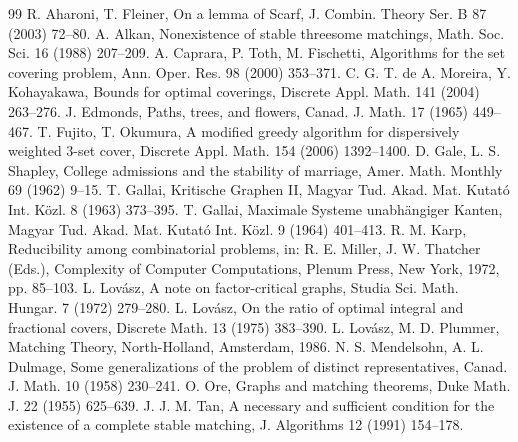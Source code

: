 \documentclass{article}
\theoremstyle{definition}
\begin{document}
\begin{thebibliography}{99}
\small
{} R. Aharoni, T. Fleiner, On a lemma of Scarf, J. Combin. Theory Ser. B 87 (2003) 72--80.
 A. Alkan, Nonexistence of stable threesome matchings, Math. Soc. Sci. 16 (1988) 207--209.
 A. Caprara, P. Toth, M. Fischetti, Algorithms for the set covering problem, Ann. Oper. Res. 98 (2000) 353--371.
 C. G. T. de A. Moreira, Y. Kohayakawa, Bounds for optimal coverings, Discrete Appl. Math. 141 (2004) 263--276.
 J. Edmonds, Paths, trees, and flowers, Canad. J. Math. 17 (1965) 449--467.
 T. Fujito, T. Okumura, A modified greedy algorithm for dispersively weighted $3$-set cover, Discrete Appl. Math. 154 (2006) 1392--1400.
 D. Gale, L. S. Shapley, College admissions and the stability of marriage, Amer. Math. Monthly 69 (1962) 9--15.
 T. Gallai, Kritische Graphen II, Magyar Tud. Akad. Mat. Kutat\'o Int. K\"ozl. 8 (1963) 373--395.
 T. Gallai, Maximale Systeme unabh\"angiger Kanten, Magyar Tud. Akad. Mat. Kutat\'o Int. K\"ozl. 9 (1964) 401--413.
 R. M. Karp, Reducibility among combinatorial problems, in: R. E. Miller, J. W. Thatcher (Eds.), Complexity of Computer Computations, Plenum Press, New York, 1972, pp. 85--103.
 L. Lov\'asz, A note on factor-critical graphs, Studia Sci. Math. Hungar. 7 (1972) 279--280.
 L. Lov\'asz, On the ratio of optimal integral and fractional covers, Discrete Math. 13 (1975) 383--390.
 L. Lov\'asz, M. D. Plummer, Matching Theory, North-Holland, Amsterdam, 1986.
 N. S. Mendelsohn, A. L. Dulmage, Some generalizations of the problem of distinct representatives, Canad. J. Math. 10 (1958) 230--241.
 O. Ore, Graphs and matching theorems, Duke Math. J. 22 (1955) 625--639.
 J. J. M. Tan, A necessary and sufficient condition for the existence of a complete stable matching, J. Algorithms 12 (1991) 154--178.
\end{thebibliography}
\end{document}
